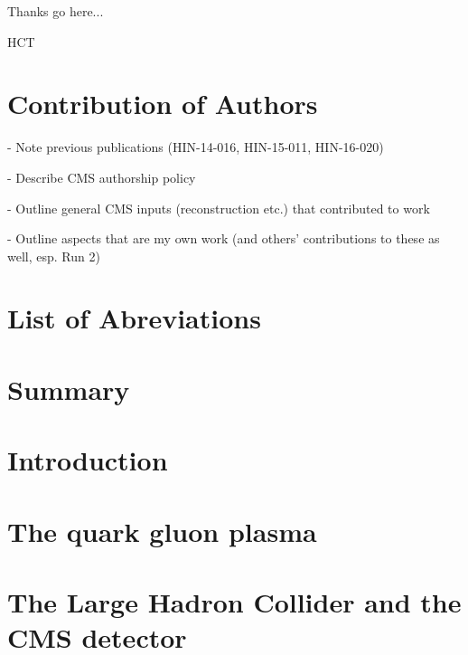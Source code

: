 \documentclass[11pt]{article}
\begin{document}
Thanks go here...

\vspace{1in}

\begin{flushright}

HCT
\end{flushright}
\clearpage{}

\section*{Contribution of Authors}

- Note previous publications (HIN-14-016, HIN-15-011, HIN-16-020)

\noindent - Describe CMS authorship policy

\noindent - Outline general CMS inputs (reconstruction etc.) that contributed to work

\noindent - Outline aspects that are my own work (and others' contributions to these as well, esp. Run 2)

\clearpage

\setcounter{tocdepth}{2}
\tableofcontents
\clearpage{}

\listoftables
\clearpage{}

\listoffigures
\clearpage{}

\section*{List of Abreviations}

\clearpage{}

\section*{Summary}

\clearpage{}



\setcounter{page}{1}
\doublespacing


\section{Introduction}
\label{sec:Introduction}

\clearpage

\section{The quark gluon plasma}
\label{sec:Theory}

\clearpage

\section{The Large Hadron Collider and the CMS detector}
\label{sec:Detector}

\clearpage
\end{document}
